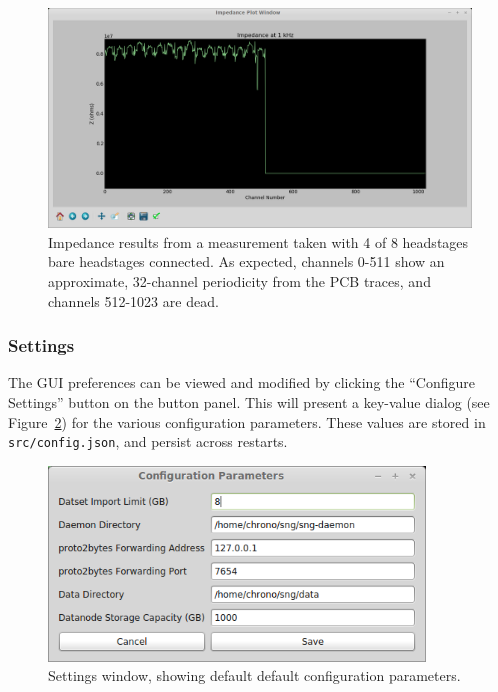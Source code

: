 \begin{figure}[h!]
\begin{center}
\includegraphics[width=15cm]{screenshots/impedance.png}
\end{center}
\caption{Impedance results from a measurement taken with 4 of 8 headstages bare headstages connected. As expected, channels 0-511 show an approximate, 32-channel periodicity from the PCB traces, and channels 512-1023 are dead.}
\label{fig_impedance}
\end{figure}

\subsubsection{Settings}
\label{sec_usage_buttonpanel_settings}

The GUI preferences can be viewed and modified by clicking the ``Configure Settings'' button on the button panel. This will present a key-value dialog (see Figure~\ref{fig_settings}) for the various configuration parameters. These values are stored in \texttt{src/config.json}, and persist across restarts.

\begin{figure}[h!]
\begin{center}
\includegraphics[width=10cm]{screenshots/settings.png}
\end{center}
\caption{Settings window, showing default default configuration parameters.}
\label{fig_settings}
\end{figure}









